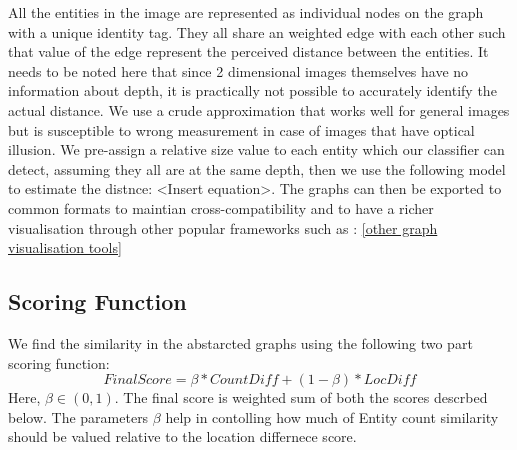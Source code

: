 \documentclass[conference]{IEEEtran}
\begin{document}
    All the entities in the image are represented as individual nodes on the graph with a unique identity tag. They all share an weighted edge with each other such that value of the edge represent the perceived distance between the entities. It needs to be noted here that since 2 dimensional images themselves have no information about depth, it is practically not possible to accurately identify the actual distance. We use a crude approximation that works well for general images but is susceptible to wrong measurement in case of images that have optical illusion. We pre-assign a relative size value to each entity which our classifier can detect, assuming they all are at the same depth, then we use the following model to estimate the distnce: <Insert equation>. The graphs can then be exported to common formats to maintian cross-compatibility and to have a richer visualisation through other popular frameworks such as : \ref{other graph visualisation tools}
    
    \subsection{Scoring Function}
    We find the similarity in the abstarcted graphs using the following two part scoring function:     
        \begin{equation}
        FinalScore = \beta * CountDiff + (1 - \beta)*LocDiff
        \end{equation}
        Here, $\beta \in (0,1)$. The final score is weighted sum of both the scores descrbed below. The parameters $\beta$ help in contolling how much of Entity count similarity should be valued relative to the location differnece score.
\end{document}
